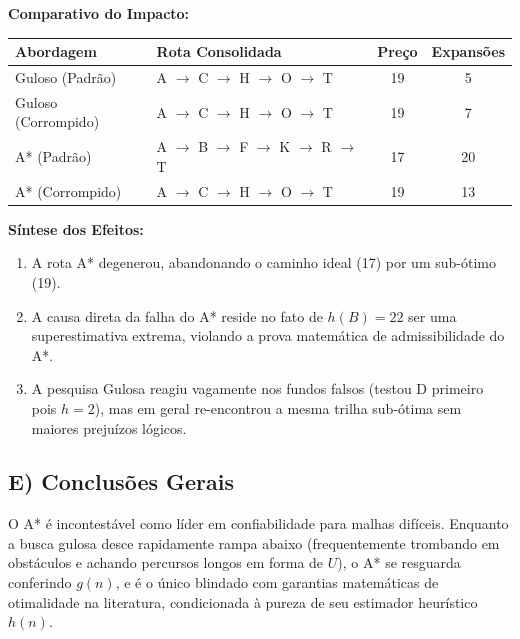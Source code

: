 \textbf{Comparativo do Impacto:}
\begin{table}[h!]
\centering
\begin{tabular}{|l|l|c|c|}
\hline
\textbf{Abordagem} & \textbf{Rota Consolidada} & \textbf{Preço} & \textbf{Expansões} \\ \hline
Guloso (Padrão) & A $\rightarrow$ C $\rightarrow$ H $\rightarrow$ O $\rightarrow$ T & 19 & 5 \\ \hline
Guloso (Corrompido) & A $\rightarrow$ C $\rightarrow$ H $\rightarrow$ O $\rightarrow$ T & 19 & 7 \\ \hline
A* (Padrão) & A $\rightarrow$ B $\rightarrow$ F $\rightarrow$ K $\rightarrow$ R $\rightarrow$ T & 17 & 20 \\ \hline
A* (Corrompido) & A $\rightarrow$ C $\rightarrow$ H $\rightarrow$ O $\rightarrow$ T & 19 & 13 \\ \hline
\end{tabular}
\end{table}

\textbf{Síntese dos Efeitos:}
\begin{enumerate}[label=\roman*)]
    \item A rota A* degenerou, abandonando o caminho ideal (17) por um sub-ótimo (19).
    \item A causa direta da falha do A* reside no fato de $h(B)=22$ ser uma superestimativa extrema, violando a prova matemática de admissibilidade do A*.
    \item A pesquisa Gulosa reagiu vagamente nos fundos falsos (testou D primeiro pois $h=2$), mas em geral re-encontrou a mesma trilha sub-ótima sem maiores prejuízos lógicos.
\end{enumerate}

\subsection*{E) Conclusões Gerais}

O A* é incontestável como líder em confiabilidade para malhas difíceis. Enquanto a busca gulosa desce rapidamente rampa abaixo (frequentemente trombando em obstáculos e achando percursos longos em forma de $U$), o A* se resguarda conferindo $g(n)$, e é o único blindado com garantias matemáticas de otimalidade na literatura, condicionada à pureza de seu estimador heurístico $h(n)$.
